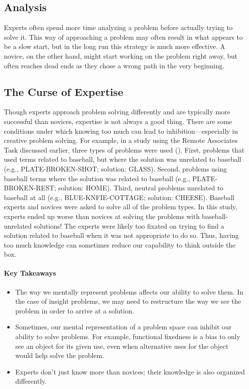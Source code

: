 \documentclass[
]{krantz}
\providecommand{\tightlist}{%
  \setlength{\itemsep}{0pt}\setlength{\parskip}{0pt}}
\begin{document}
\subsection*{Analysis}\label{analysis}


Experts often spend more time analyzing a problem before actually trying to solve it. This way of approaching a problem may often result in what appears to be a slow start, but in the long run this strategy is much more effective. A novice, on the other hand, might start working on the problem right away, but often reaches dead ends as they chose a wrong path in the very beginning.

\subsection*{The Curse of Expertise}\label{the-curse-of-expertise}


Though experts approach problem solving differently and are typically more successful than novices, expertise is not always a good thing. There are some conditions under which knowing too much can lead to inhibition---especially in creative problem solving. For example, in a study using the Remote Associates Task discussed earlier, three types of problems were used (). First, problems that used terms related to baseball, but where the solution was unrelated to baseball (e.g., PLATE-BROKEN-SHOT; solution: GLASS). Second, problems using baseball terms where the solution was related to baseball (e.g., PLATE-BROKEN-REST; solution: HOME). Third, neutral problems unrelated to baseball at all (e.g., BLUE-KNFIE-COTTAGE; solution: CHEESE). Baseball experts and novices were asked to solve all of the problem types. In this study, experts ended up worse than novices at solving the problems with baseball-unrelated solutions! The experts were likely too fixated on trying to find a solution related to baseball when it was not appropriate to do so. Thus, having too much knowledge can sometimes reduce our capability to think outside the box.

\paragraph*{Key Takeaways}\label{key-takeaways-9}

\begin{itemize}
\tightlist
\item
  The way we mentally represent problems affects our ability to solve them. In the case of insight problems, we may need to restructure the way we see the problem in order to arrive at a solution.
\item
  Sometimes, our mental representation of a problem space can inhibit our ability to solve problems. For example, functional fixedness is a bias to only see an object for its given use, even when alternative uses for the object would help solve the problem.
\item
  Experts don't just know more than novices; their knowledge is also organized differently.
\end{itemize}
\end{document}
